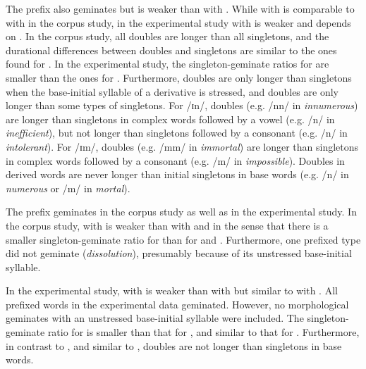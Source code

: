 The prefix  also geminates but  is weaker than  with . While  with  is comparable to  with  in the corpus study, in the experimental study  with  is weaker and depends on . 
 In the corpus study, 
 all doubles are longer than all singletons, and the durational differences between doubles and singletons are similar to the ones found for . 
In the experimental study, 
the singleton-geminate ratios for  are smaller than the ones for .
Furthermore, doubles are only longer than singletons when the base-initial syllable of a derivative is stressed, and doubles are only longer than some types of singletons. For /ɪn/, doubles (e.g. /nn/ in \textit{innumerous}) are longer than singletons in complex words followed by a vowel (e.g. /n/ in \textit{inefficient}), but not longer than singletons followed by a consonant (e.g. /n/ in \textit{intolerant}). For /ɪm/, doubles (e.g. /mm/ in \textit{immortal}) are longer than singletons in complex words followed by a consonant (e.g. /m/ in \textit{impossible}). Doubles in derived words are never longer than initial singletons in base words (e.g. /n/ in \textit{numerous} or /m/ in \textit{mortal}). 




The prefix  geminates in the corpus study as well as in the experimental study. In the corpus study,  with  is weaker than  with  and  in the sense that there is a smaller singleton-geminate ratio for  than for  and . Furthermore, one prefixed type did not geminate (\textit{dissolution}), presumably because of its unstressed base-initial syllable. 

In the experimental study,  with  is weaker than  with  but similar to  with .
All prefixed words in the experimental data geminated. However, no morphological geminates with an unstressed base-initial syllable were included. 
The singleton-geminate ratio for  is smaller than that for , and similar to that for . 
Furthermore, in contrast to , and similar to , doubles are not longer than singletons in base words.  


